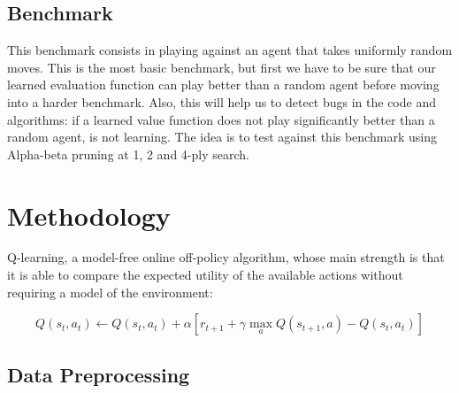 \documentclass[a4paper]{article}
\begin{document}
\subsection{Benchmark}

This benchmark consists in playing against an agent that takes uniformly random moves. This is the most basic benchmark, but first we have to be sure that our learned evaluation function can play better than a random agent before moving into a harder benchmark. Also, this will help us to detect bugs in the code and algorithms: if a learned value function does not play significantly better than a random agent, is not learning. The idea is to test against this benchmark using Alpha-beta pruning at 1, 2 and 4-ply search.


\section{Methodology}

Q-learning, a model-free online off-policy algorithm, whose main strength is that it is able to compare the expected utility of the available actions without requiring a model of the environment:

\begin{equation}
        Q(s_t, a_t) \gets Q(s_t, a_t) + \alpha [r_{t+1} + \gamma \max_a Q(s_{t+1}, a) - Q(s_t, a_t)]
\end{equation}

\subsection{Data Preprocessing}
\end{document}
